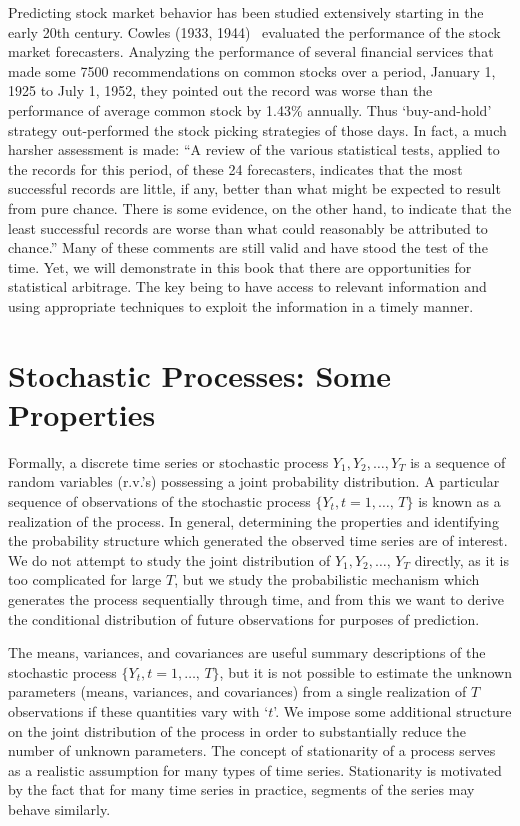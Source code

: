 Predicting stock market behavior has been studied extensively starting in the early 20th century. Cowles (1933, 1944)~\cite{cow1,cow2} evaluated the performance of the stock market forecasters. Analyzing the performance of several financial services that made some 7500 recommendations on common stocks over a period, January 1, 1925 to July 1, 1952, they pointed out the record was worse than the performance of average common stock by 1.43\% annually. Thus `buy-and-hold' strategy out-performed the stock picking strategies of those days. In fact, a much harsher assessment is made: ``A review of the various statistical tests, applied to the records for this period, of these 24 forecasters, indicates that the most successful records are little, if any, better than what might be expected to result from pure chance. There is some evidence, on the other hand, to indicate that the least successful records are worse than what could reasonably be attributed to chance.'' Many of these comments are still valid and have stood the test of the time. Yet, we will demonstrate in this book that there are opportunities for statistical arbitrage. The key being to have access to relevant information and using appropriate techniques to exploit the information in a timely manner. 



\section{Stochastic Processes: Some Properties\label{sec:stoc_proc}}

Formally, a discrete time series or stochastic process $Y_1, Y_2, \ldots, Y_T$ is a sequence of random variables (r.v.'s) possessing a joint probability distribution. A particular sequence of observations of the stochastic process $\{ Y_t, t=1, \ldots,  \, T\}$ is known as a realization of the process. In general, determining the properties and identifying the probability structure which generated the observed time series are of interest. We do not attempt to study the joint distribution of $Y_1, Y_2, \ldots, \, Y_T$ directly, as it is too complicated for large $T$, but we study the probabilistic mechanism which generates the process sequentially through time, and from this we want to derive the conditional distribution of future observations for purposes of prediction.


The means, variances, and covariances are useful summary descriptions of the stochastic process $\{ Y_t, t=1,\ldots,\,T \}$, but it is not possible to estimate the unknown parameters (means, variances, and covariances) from a single realization of $T$ observations if these quantities vary with `$t$'. We impose some additional structure on the joint distribution of the process in order to substantially reduce the number of unknown parameters. The concept of stationarity of a process serves as a realistic assumption for many types of time series. Stationarity is motivated by the fact that for many time series in practice, segments of the series may behave similarly. \twomedskip



